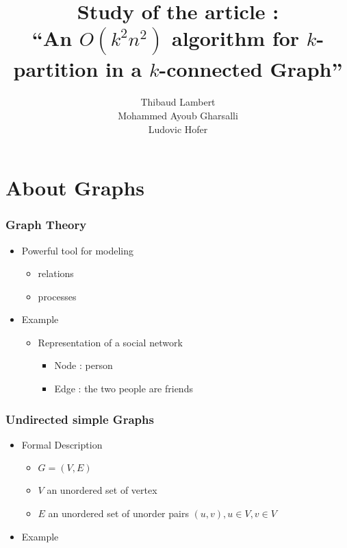 \documentclass[xcolor=dvipsnames]{beamer}
\title[$O(k^2n^2)$ algorithm for $k$-partitionning]{Study of the article :\\``An $O(k^2n^2)$ algorithm for $k$-partition in a $k$-connected Graph''}
\author[Lambert, Gharsalli, Hofer]
       {Thibaud Lambert\\Mohammed Ayoub Gharsalli\\Ludovic Hofer}
\institute{University of Bordeaux}
\begin{document}
\begin{frame}[plain]
  \maketitle
\end{frame}

\begin{frame}[plain]
  \tableofcontents
\end{frame}

\section{About Graphs}

\begin{frame}
  \frametitle{Graph Theory}
  \begin{itemize}
  \item Powerful tool for modeling
    \begin{itemize}
    \item relations
    \item processes
    \end{itemize}
  \item Example
    \begin{itemize}
    \item Representation of a social network
      \begin{itemize}
      \item Node : person
      \item Edge : the two people are friends
      \end{itemize}
    \end{itemize}
  \end{itemize}
\end{frame}

\begin{frame}
  \frametitle{Undirected simple Graphs}
  \begin{itemize}
    \item Formal Description
      \begin{itemize}
      \item $G = (V,E)$
      \item $V$ an unordered set of vertex
      \item $E$ an unordered set of unorder pairs $(u,v), u \in V, v \in V$
      \end{itemize}
    \item Example
  \end{itemize}
\end{frame}
\end{document}
